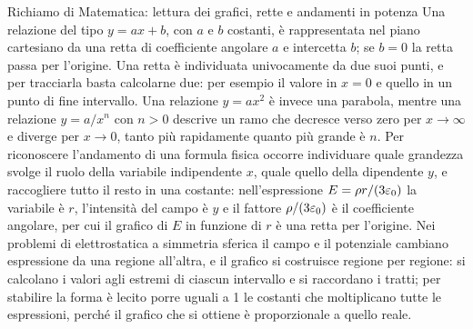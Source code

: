 \documentclass[11pt,a4paper]{article}
\begin{document}
\begin{riquadro}[label=ric:gauss:grafici]{Richiamo di Matematica: lettura dei grafici, rette e andamenti in potenza}
Una relazione del tipo $y=ax+b$, con $a$ e $b$ costanti, è rappresentata nel piano cartesiano da una retta di coefficiente angolare $a$ e intercetta $b$; se $b=0$ la retta passa per l'origine. Una retta è individuata univocamente da due suoi punti, e per tracciarla basta calcolarne due: per esempio il valore in $x=0$ e quello in un punto di fine intervallo. Una relazione $y=ax^2$ è invece una parabola, mentre una relazione $y=a/x^n$ con $n>0$ descrive un ramo che decresce verso zero per $x\to\infty$ e diverge per $x\to0$, tanto più rapidamente quanto più grande è $n$. Per riconoscere l'andamento di una formula fisica occorre individuare quale grandezza svolge il ruolo della variabile indipendente $x$, quale quello della dipendente $y$, e raccogliere tutto il resto in una costante: nell'espressione $E=\rho r/(3\varepsilon_0)$ la variabile è $r$, l'intensità del campo è $y$ e il fattore $\rho/(3\varepsilon_0)$ è il coefficiente angolare, per cui il grafico di $E$ in funzione di $r$ è una retta per l'origine. Nei problemi di elettrostatica a simmetria sferica il campo e il potenziale cambiano espressione da una regione all'altra, e il grafico si costruisce regione per regione: si calcolano i valori agli estremi di ciascun intervallo e si raccordano i tratti; per stabilire la forma è lecito porre uguali a 1 le costanti che moltiplicano tutte le espressioni, perché il grafico che si ottiene è proporzionale a quello reale.
\end{riquadro}
\end{document}
